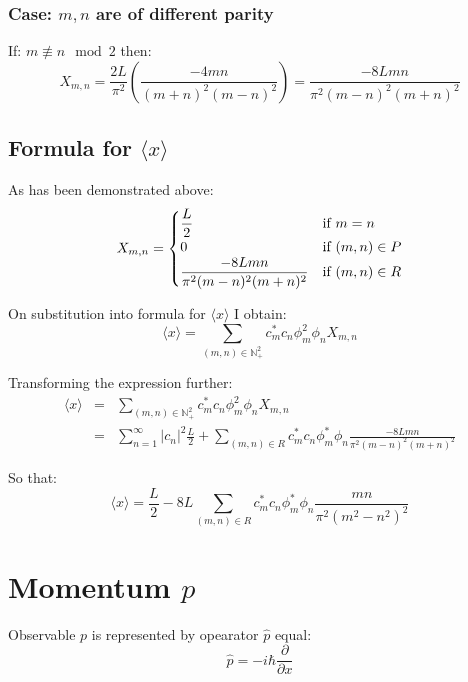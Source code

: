 \documentclass[12pt]{article}
\begin{document}
\subsubsection{Case: $m, n$ are of different parity}
If: $m \not\equiv n \mod2$ then:
\begin{equation}
X_{m,n} = \frac{2L}{\pi^2} \left(
	\frac{-4mn}{(m+n)^2(m-n)^2}
\right) = \frac{-8Lmn}{\pi^2(m-n)^2 (m+n)^2}
\end{equation}

\subsection{Formula for $\langle x \rangle $}
As has been demonstrated above:
\begin{equation}
X_{m, n} = 
\begin{cases} 
\displaystyle \frac{L}{2}  & \text{if $ m=n $} \\ 
\displaystyle 0 & \text{if $(m, n) \in P$} \\
\displaystyle \frac{-8Lmn}{\pi^2(m-n)^2 (m+n)^2} & \text{if $(m, n) \in R$} 
\end{cases}
\end{equation}

\noindent On substitution into formula for $\langle x \rangle$ I obtain:
\begin{equation}
\langle x \rangle = \sum_{(m,n) \in \mathbb{N}_+^2} c_m^* c_n \phi_m^2 \phi_n X_{m, n}
\end{equation}

\noindent Transforming the expression further:
\begin{eqnarray*}
\langle x \rangle &=& \sum_{(m,n) \in \mathbb{N}_+^2} c_m^* c_n \phi_m^2 \phi_n X_{m, n} \\
&=& \sum_{n=1}^{\infty} |c_n|^2 \frac{L}{2} + \sum_{(m,n) \in R} c_m^* c_n \phi_m^* \phi_n \frac{-8Lmn}{\pi^2(m-n)^2 (m+n)^2}
\end{eqnarray*}

\noindent So that:
\begin{equation}
\label{derivative_exp_pos_wrt_time}
\langle x \rangle = \frac{L}{2} - 8L \sum_{(m,n) \in R} c_m^* c_n \phi_m^* \phi_n \frac{mn}{\pi^2(m^2-n^2)^2}
\end{equation}



\section{Momentum $p$}
Observable $p$ is represented by opearator $\hat{p}$ equal:
\begin{equation*}
\hat{p} = -i \hbar \frac{\partial}{\partial x}
\end{equation*} 
\end{document}
